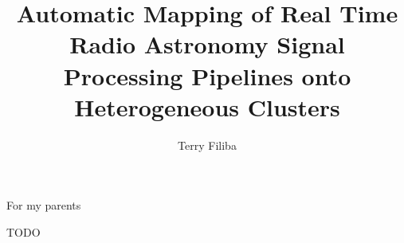 \documentclass{ucbthesis}
\begin{document}

\title{Automatic Mapping of Real Time Radio Astronomy Signal Processing Pipelines onto Heterogeneous Clusters}
\author{Terry Filiba}




\maketitle
\approvalpage
\copyrightpage



\begin{frontmatter}

\begin{dedication}
\null\vfil
\begin{center}
For my parents\\\vspace{12pt}
\end{center}
\vfil\null
\end{dedication}

\tableofcontents
\clearpage
\listoffigures
\clearpage
\listoftables

\begin{acknowledgements}
TODO
\end{acknowledgements}

\end{frontmatter}

\pagestyle{headings}


 
 
 
 
 
 
 



\printbibliography
\end{document}
